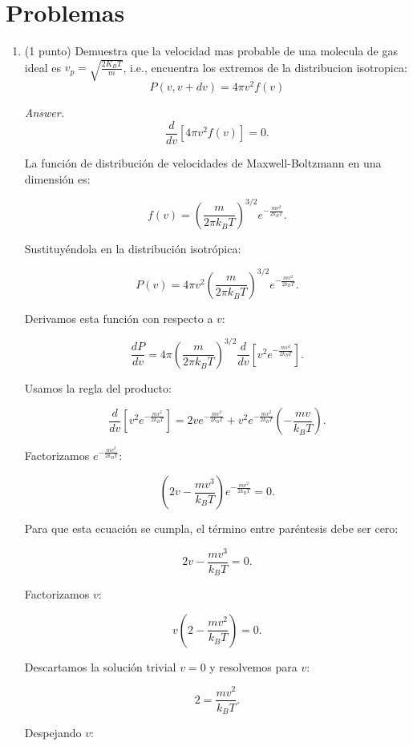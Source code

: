 \documentclass{elsarticle}
\begin{document}
\section*{Problemas}

\begin{enumerate}

    \item[1.] (1 punto) Demuestra que la velocidad mas probable de una molecula de gas ideal es \(v_{p} = \sqrt{\frac{2K_{B}T}{m}}\), i.e., encuentra los extremos de la distribucion isotropica:
    \[
    P(v,v+dv) = 4\pi v^{2}f(v)
    \]

\color{purple}\textit{Answer.}\color{black} \[
\frac{d}{dv} [ 4\pi v^2 f(v) ] = 0.
\]

La función de distribución de velocidades de Maxwell-Boltzmann en una dimensión es:

\[
f(v) = \left( \frac{m}{2\pi k_B T} \right)^{3/2} e^{- \frac{m v^2}{2 k_B T}}.
\]

Sustituyéndola en la distribución isotrópica:

\[
P(v) = 4\pi v^2 \left( \frac{m}{2\pi k_B T} \right)^{3/2} e^{- \frac{m v^2}{2 k_B T}}.
\]

Derivamos esta función con respecto a \( v \):

\[
\frac{dP}{dv} = 4\pi \left( \frac{m}{2\pi k_B T} \right)^{3/2} \frac{d}{dv} \left[ v^2 e^{- \frac{m v^2}{2 k_B T}} \right].
\]

Usamos la regla del producto:

\[
\frac{d}{dv} \left[ v^2 e^{- \frac{m v^2}{2 k_B T}} \right] = 2v e^{- \frac{m v^2}{2 k_B T}} + v^2 e^{- \frac{m v^2}{2 k_B T}} \left(- \frac{m v}{k_B T} \right).
\]

Factorizamos \( e^{- \frac{m v^2}{2 k_B T}} \):

\[
\left( 2v - \frac{m v^3}{k_B T} \right) e^{- \frac{m v^2}{2 k_B T}} = 0.
\]

Para que esta ecuación se cumpla, el término entre paréntesis debe ser cero:

\[
2v - \frac{m v^3}{k_B T} = 0.
\]

Factorizamos \( v \):

\[
v \left( 2 - \frac{m v^2}{k_B T} \right) = 0.
\]

Descartamos la solución trivial \( v = 0 \) y resolvemos para \( v \):

\[
2 = \frac{m v^2}{k_B T}.
\]

Despejando \( v \):


\end{enumerate}
\end{document}
